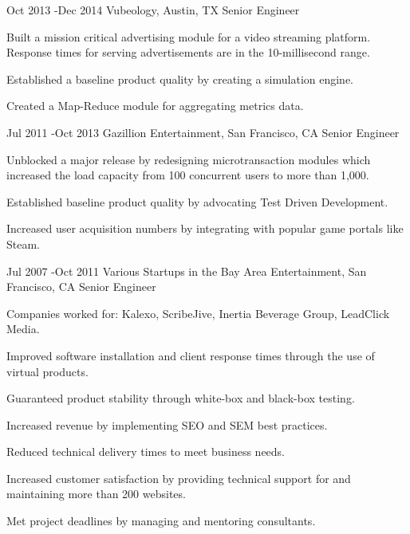 \documentclass[10pt]{article} %
\begin{document}

\job
{Oct 2013 -}{Dec 2014}
{Vubeology, Austin, TX}
{}
{Senior Engineer}
{
\begin{itemize-noindent}
\item{Built a mission critical advertising module for a video streaming platform. Response times for serving advertisements are in the 10-millisecond range.} 
\item{Established a baseline product quality by creating a simulation engine.} 
\item{Created a Map-Reduce module for aggregating metrics data.}
\end{itemize-noindent}
}


\job
{Jul 2011 -}{Oct 2013}
{Gazillion Entertainment, San Francisco, CA}
{}
{Senior Engineer}
{
\begin{itemize-noindent}

\item{Unblocked a major release by redesigning microtransaction modules which increased the load capacity from 100 concurrent users to more than 1,000.}
\item{Established baseline product quality by advocating Test Driven Development.}
\item{Increased user acquisition numbers by integrating with popular game portals like Steam.} 
\end{itemize-noindent}
}


\job
{Jul 2007 -}{Oct 2011}
{Various Startups in the Bay Area Entertainment, San Francisco, CA}
{}
{Senior Engineer}
{
\begin{itemize-noindent}

\item{Companies worked for: Kalexo, ScribeJive, Inertia Beverage Group, LeadClick Media.} 
\item{Improved software installation and client response times through the use of virtual products.}
\item{Guaranteed product stability through white-box and black-box testing.}
\item{Increased revenue by implementing SEO and SEM best practices.}
\item{Reduced technical delivery times to meet business needs.} 
\item{Increased customer satisfaction by providing technical support for and maintaining more than 200 websites.}
\item{Met project deadlines by managing and mentoring consultants.}

\end{itemize-noindent}
}
\end{document}
